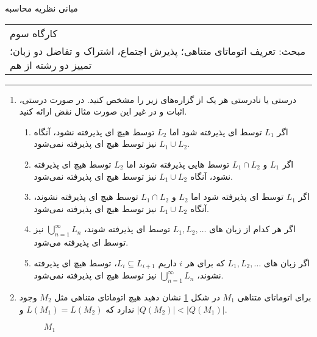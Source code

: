 \documentclass{article}
\begin{document}
	\begin{center}
		\Huge
		مبانی نظریه محاسبه
	\end{center}
	\Large
	\begin{tabularx}{\linewidth}{>{\raggedleft\arraybackslash}X}
		کارگاه سوم
		\\
		مبحث: تعریف اتوماتای متناهی؛ پذیرش اجتماع، اشتراک و تفاضل دو زبان؛ 
		 تمییز \LTRfootnote{distinguishing} دو رشته از هم
		\\
		
	\end{tabularx}
	\rule{\textwidth}{1pt}
	\large
	\begin{enumerate}
		\item 
				درستی یا نادرستی هر یک از گزاره‌های زیر را مشخص کنید. در صورت درستی، اثبات و در غیر این صورت مثال نقض ارائه کنید.
		\begin{enumerate}
			\item 
			اگر $L_1 $ توسط ای پذیرفته شود اما $L_2 $ توسط هیچ ای پذیرفته نشود، آنگاه $ L_1 \cup L_2 $ نیز توسط هیچ ای پذیرفته نمی‌شود.
			\item 
			اگر $L_1 $ و $ L_1 \cap L_2 $ توسط هایی پذیرفته شوند اما $L_2 $ توسط هیچ ای پذیرفته نشود، آنگاه $ L_1 \cup L_2 $ نیز توسط هیچ ای پذیرفته نمی‌شود.
			\item 
			اگر $L_1 $ توسط ای پذیرفته شود اما $L_2 $ و $ L_1 \cap L_2 $ توسط هیچ ای پذیرفته نشوند، آنگاه $ L_1 \cup L_2 $ نیز توسط هیچ ای پذیرفته نمی‌شود.
			\item 
		اگر هر کدام از زبان های
		$L_1, L_2 , \dots$  
		توسط ای پذیرفته شوند،
		$ \bigcup_{n = 1}^{\infty} L_n$
    نیز توسط ای پذیرفته می‌شود.
			\item 
	اگر زبان های
	$L_1, L_2 , \dots$
	که برای هر $i$ داریم 
	$L_i \subseteq L_{i+1} $، 
 توسط هیچ ای پذیرفته نشوند،
		$ \bigcup_{n = 1}^{\infty} L_n$
		 نیز توسط هیچ ای پذیرفته نمی‌شود.
			
		\end{enumerate}	
			
			
		\item 
 		برای اتوماتای متناهی $M_1$ در شکل  \ref{M1} نشان دهید هیچ اتوماتای متناهی مثل $ M_2 $ وجود ندارد که $L(M_1) = L(M_2)$ و $|Q(M_2)|<|Q(M_1)|$.
		\begin{figure}[h]
			\begin{minipage}{1\textwidth}
				\centering
				\caption{$M_1$}
				\label{M1}
			\end{minipage}%
		\end{figure}
		

\end{enumerate}
\end{document}
